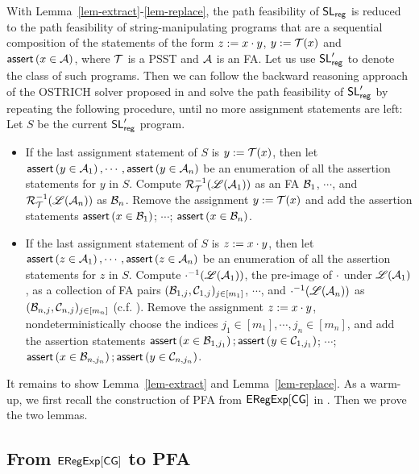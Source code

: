 With Lemma~\ref{lem-extract}-\ref{lem-replace}, the path feasibility of $\mathsf{SL}_{\sf reg}$ is reduced to the path feasibility of string-manipulating programs that are a sequential composition of the statements of the form $z:=x \cdot y$, $y:=\mathcal{T}(x)$ and $\textsf{assert}\left(x \in \mathcal{A}\right)$, where $\mathcal{T}$ is a PSST and $\mathcal{A}$ is an FA. Let us use  $\mathsf{SL}'_{\sf reg}$ to denote the class of such programs. Then we can follow the backward reasoning approach of the OSTRICH solver proposed in \cite{CCH+18,CHL+19} and solve the path feasibility of $\mathsf{SL}'_{\sf reg}$ by repeating the following procedure, until no more assignment statements are left:\\
Let $S$ be the current $\mathsf{SL}'_{\sf reg}$ program.
\begin{itemize}
\item If the last assignment statement of $S$ is $y:=\mathcal{T}(x)$, then let $\textsf{assert}\left(y \in \mathcal{A}_1\right), \cdots, \textsf{assert}\left(y \in \mathcal{A}_n\right)$ be an enumeration of all the assertion statements for $y$ in $S$. Compute $\mathcal{R}^{-1}_{\mathcal{T}}(\mathscr{L}(\mathcal{A}_1))$ as an FA $\mathcal{B}_1$, $\cdots$, and $\mathcal{R}^{-1}_{\mathcal{T}}(\mathscr{L}(\mathcal{A}_n))$ as $\mathcal{B}_n$. Remove  the assignment  $y:=\mathcal{T}(x)$ and add the assertion statements $\textsf{assert}\left(x \in \mathcal{B}_1\right)$; $\cdots$; $\textsf{assert}\left(x \in \mathcal{B}_n\right)$. 
%
\item If the last assignment statement of $S$ is $z:=x \cdot y$, then let $\textsf{assert}\left(z \in \mathcal{A}_1\right), \cdots, \textsf{assert}\left(z \in \mathcal{A}_n\right)$ be an enumeration of all the assertion statements for $z$ in $S$. Compute $\cdot^{-1}(\mathscr{L}(\mathcal{A}_1))$, the pre-image of $\cdot$ under $\mathscr{L}(\mathcal{A}_1)$, as a collection of FA pairs $(\mathcal{B}_{1,j}, \mathcal{C}_{1,j})_{j \in [m_1]}$, $\cdots$, and $\cdot^{-1}(\mathscr{L}(\mathcal{A}_n))$ as $(\mathcal{B}_{n, j}, \mathcal{C}_{n,j})_{j \in [m_n]}$ (c.f. \cite{CHL+19}). Remove the assignment $z:=x \cdot y$, nondeterministically choose the indices $j_1 \in [m_1], \cdots, j_n \in [m_n]$, and add the assertion statements $\textsf{assert}\left(x \in \mathcal{B}_{1,j_1}\right); \textsf{assert}\left(y \in \mathcal{C}_{1, j_1}\right)$; $\cdots$; $\textsf{assert}\left(x \in \mathcal{B}_{n,j_n}\right); \textsf{assert}\left(y \in \mathcal{C}_{n, j_n}\right)$. 
\end{itemize}

It remains to show Lemma~\ref{lem-extract} and Lemma~\ref{lem-replace}. As a warm-up, we first recall the construction of PFA from ${\sf ERegExp}[\sf CG]$ in \cite{BDM14}.  
Then we prove the two lemmas. 


\subsection{From ${\sf ERegExp}[\sf CG]$ to PFA}
\label{construction:pnfa}

